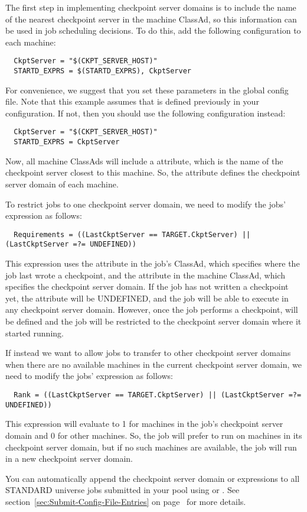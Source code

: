 The first step in implementing checkpoint server domains is to include
the name of the nearest checkpoint server in the machine
ClassAd, so this information can be used in job scheduling decisions.
To do this, add the following configuration to each machine:
\begin{verbatim}
  CkptServer = "$(CKPT_SERVER_HOST)"
  STARTD_EXPRS = $(STARTD_EXPRS), CkptServer
\end{verbatim}
For convenience, we suggest that you set these parameters in the
global config file.  Note that this example assumes that
 is defined previously in your configuration.  If
not, then you should use the following configuration instead:
\begin{verbatim}
  CkptServer = "$(CKPT_SERVER_HOST)"
  STARTD_EXPRS = CkptServer
\end{verbatim}
Now, all machine ClassAds will include a 
attribute, which is the name of the checkpoint server closest to this
machine.  So, the  attribute defines the checkpoint
server domain of each machine.

To restrict jobs to one checkpoint server domain, we need to modify
the jobs'  expression as follows:
\begin{verbatim}
  Requirements = ((LastCkptServer == TARGET.CkptServer) || (LastCkptServer =?= UNDEFINED))
\end{verbatim}
This  expression uses the 
attribute in the job's ClassAd, which specifies where the job last
wrote a checkpoint, and the  attribute in the
machine ClassAd, which specifies the checkpoint server domain.  If the
job has not written a checkpoint yet, the 
attribute will be UNDEFINED, and the job will be able to execute in
any checkpoint server domain.  However, once the job performs a
checkpoint,
 will be defined and the job will be restricted to the
checkpoint server domain where it started running.

If instead we want to allow jobs to transfer to other checkpoint
server domains when there are no available machines in the current
checkpoint server domain, we need to modify the jobs'  expression
as follows:
\begin{verbatim}
  Rank = ((LastCkptServer == TARGET.CkptServer) || (LastCkptServer =?= UNDEFINED))
\end{verbatim}
This  expression will evaluate to 1 for machines in the
job's checkpoint server domain and 0 for other machines.  So, the job
will prefer to run on machines in its checkpoint server domain, but if
no such machines are available, the job will run in a new checkpoint
server domain.

You can automatically append the checkpoint server domain
 or  expressions to all STANDARD
universe jobs submitted in your pool using
 or .
See section~\ref{sec:Submit-Config-File-Entries} on
page~\pageref{sec:Submit-Config-File-Entries} for more details.
